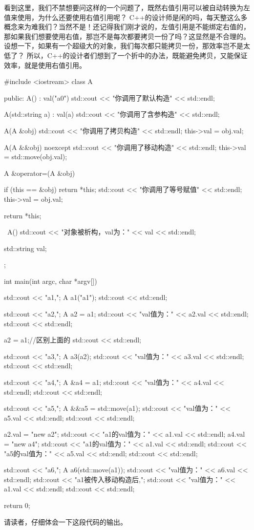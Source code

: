 看到这里，我们不禁想要问这样的一个问题了，既然右值引用可以被自动转换为左值来使用，为什么还要使用右值引用呢？
C++的设计师是闲的吗，每天整这么多概念来为难我们？当然不是！还记得我们刚才说的，左值引用是不能绑定右值的，
那如果我们想要使用右值，那岂不是每次都要拷贝一份了吗？这显然是不合理的。设想一下，如果有一个超级大的对象，我们每次都只能拷贝一份，那效率岂不是太低了？
所以，C++的设计者们想到了一个折中的办法，既能避免拷贝，又能保证效率，就是使用右值引用。
\begin{tcode}
#include <iostream>
class A {
public:
    A() : val("a0") { std::cout << "你调用了默认构造" << std::endl; }

    A(std::string a) : val(a) { std::cout << "你调用了含参构造" << std::endl; }

    A(A &obj) {
        std::cout << "你调用了拷贝构造" << std::endl;
        this->val = obj.val;
    }

    A(A &&obj) noexcept {
        std::cout << "你调用了移动构造" << std::endl;
        this->val = std::move(obj.val);
    }

    A &operator=(A &obj) {
        if (this == &obj)
            return *this;
        std::cout << "你调用了等号赋值" << std::endl;
        this->val = obj.val;

        return *this;
    }

    ~A() { std::cout << "对象被析构，val为：" << val << std::endl; }

    std::string val;
};

int main(int argc, char *argv[]) {
    std::cout << "a1,";
    A a1("a1");
    std::cout << std::endl;

    std::cout << "a2,";
    A a2 = a1;
    std::cout << "val值为：" << a2.val << std::endl;
    std::cout << std::endl;

    a2 = a1;//区别上面的
    std::cout << std::endl;

    std::cout << "a3,";
    A a3(a2);
    std::cout << "val值为：" << a3.val << std::endl;
    std::cout << std::endl;

    std::cout << "a4,";
    A &a4 = a1;
    std::cout << "val值为：" << a4.val << std::endl;
    std::cout << std::endl;

    std::cout << "a5,";
    A &&a5 = std::move(a1);
    std::cout << "val值为：" << a5.val << std::endl;
    std::cout << std::endl;

    a2.val = "new a2";
    std::cout << "a1的val值为：" << a1.val << std::endl;
    a4.val = "new a4";
    std::cout << "a1的val值为：" << a1.val << std::endl;
    std::cout << "a5的val值为：" << a5.val << std::endl;
    std::cout << std::endl;

    std::cout << "a6,";
    A a6(std::move(a1));
    std::cout << "val值为：" << a6.val << std::endl;
    std::cout << "a1被传入移动构造后,";
    std::cout << "val值为：" << a1.val << std::endl;
    std::cout << std::endl;


    return 0;
}
\end{tcode}
请读者，仔细体会一下这段代码的输出。

